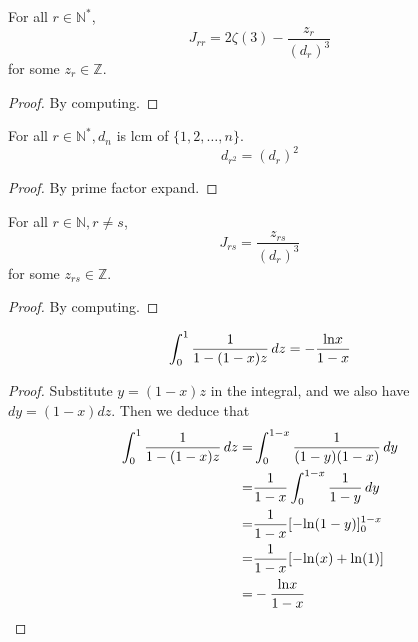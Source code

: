 \begin{lemma}\label{Jrr_linear_form}
    For all $r \in \mathbb{N}^*$,
    \[ J_{rr} = 2 \zeta(3) - \frac{z_r}{(d_r)^3} \]
    for some $z_r \in \mathbb{Z}$.
\end{lemma}
\begin{proof}
    \leanok
    By computing.
\end{proof}

\begin{lemma}\label{d_r_2}
    For all $r \in \mathbb{N}^*, d_n$ is lcm of $\{1, 2, \ldots, n\}.$ 
    \[ d_{r^2} = (d_r)^2 \]
\end{lemma}
\begin{proof}
    \leanok
    By prime factor expand.
\end{proof}

\begin{lemma}\label{Jrs_postive_rational}
    For all $r \in \mathbb{N}, r \neq s$,
    \[ J_{rs} = \frac{z_{rs}}{(d_r)^3}\]
    for some $z_{rs} \in \mathbb{Z}$.
\end{lemma}
\begin{proof}
    \leanok
    By computing.
\end{proof}

\begin{lemma}\label{one_var_substitution}
    \[ \int_{0}^{1} \frac{1}{1 - (1 - x)z} \, dz= -\frac{{\rm ln}x}{1 - x} \]
\end{lemma}
\begin{proof}
    \leanok
    Substitute $y = (1 - x)z$ in the integral, and we also have $dy = (1-x)dz$. Then we deduce that
    \begin{align*}
        \int_{0}^{1} \frac{1}{1 - (1 - x)z} \, dz =& \int_{0}^{1-x} \frac{1}{(1 - y)(1-x)} \, dy \\
        =&\frac{1}{1-x}\int_{0}^{1-x} \frac{1}{1 - y} \, dy\\
        =&\frac{1}{1-x}[-{\rm ln}(1-y)]_0^{1-x} \\
        =&\frac{1}{1-x}[-{\rm ln}(x) + {\rm ln}(1)] \\
        =&-\frac{{\rm ln}x}{1 - x}
    \end{align*}
\end{proof}

